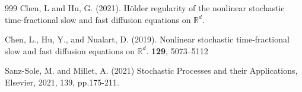 \documentclass[a4paper,11pt]{article}
\numberwithin{equation}{section}
\theoremstyle{plain}
\theoremstyle{definition}
\newcommand{\R}{\mathbb{R}}
\numberwithin{NQ}{section}
\numberwithin{LQ}{section}
\numberwithin{ZQ}{section}
\begin{document}
\begin{thebibliography}{999}
	Chen, L and Hu, G. (2021).
	\newblock H\"older regularity of the nonlinear stochastic time-fractional slow and fast diffusion equations on $\R^d$.
	
	Chen, L., Hu, Y., and Nualart, D. (2019).
	\newblock Nonlinear stochastic time-fractional slow and fast diffusion equations on $\R^d$.
	 \textbf{129}, 5073--5112

	Sanz-Sole, M. and Millet, A. (2021)
	\newblock Stochastic Processes and their Applications, Elsevier, 2021, 139, pp.175-211.
\end{thebibliography}
\end{document}
